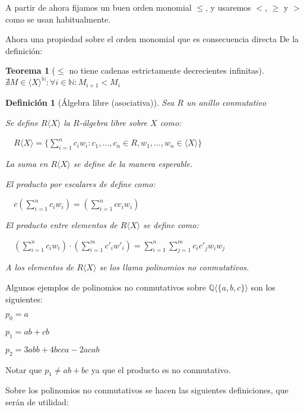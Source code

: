 \documentclass{amsbook}
\theoremstyle{customstyle}
\newtheorem{definition}{Definición}[section]
\newtheorem{theorem}{Teorema}[section]
\begin{document}
A partir de ahora fijamos un buen orden monomial $≤$, y usaremos $<$, $≥$ y $>$ como se usan habitualmente.

Ahora una propiedad sobre el orden monomial que es consecuencia directa De la definición:

\begin{theorem}[$≤$ no tiene cadenas estrictamente decrecientes infinitas]

  $∄M ∈ ⟨X⟩^ℕ : ∀i ∈ ℕ : M_{i + 1} < M_i$

\end{theorem}

\begin{definition}[Álgebra libre (asociativa)]
Sea $R$ un anillo conmutativo

Se define $R⟨X⟩$ la $R$-álgebra libre sobre $X$ como:

  $R⟨X⟩ = \{\sum_{i = 1}^n c_i w_i : c_1, …, c_n ∈ R, w_1, …, w_n ∈ ⟨X⟩\}$

La suma en $R⟨X⟩$ se define de la manera esperable.

El producto por escalares de define como:

  $c (\sum_{i = 1}^n c_i w_i) = (\sum_{i = 1}^n c c_i w_i)$

El producto entre elementos de $R⟨X⟩$ se define como:

  $(\sum_{i = 1}^n c_i w_i) · (\sum_{i = 1}^m c'_i w'_i) = \sum_{i = 1}^n \sum_{j = 1}^m c_i c'_j w_i w_j$

A los elementos de $R⟨X⟩$ se los llama polinomios no conmutativos.
\end{definition}

Algunos ejemplos de polinomios no conmutativos sobre $ℚ⟨\{a, b, c\}⟩$ son los siguientes:

$p_0 = a$

$p_1 = ab + cb$

$p_2 = 3 abb + 4 bcca - 2 acab$

Notar que $p_1 ≠ ab + bc$ ya que el producto es no conmutativo.

Sobre los polinomios no conmutativos se hacen las siguientes definiciones, que serán de utilidad:
\end{document}
